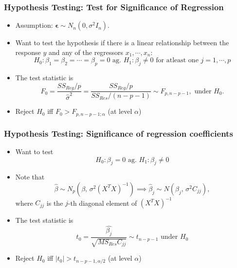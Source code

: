 \documentclass[10pt]{beamer} %
\begin{document}
\begin{frame}
	\frametitle{Hypothesis Testing: Test for Significance of Regression}
	\begin{itemize}
      \item Assumption: $\boldsymbol{\epsilon}\sim N_n(0, \sigma^2 I_n)$.
      \item Want to test the hypothesis if there is a linear
         relationship between the response $y$ and any of the regressors $x_1,
         \cdots, x_n$:
         $$H_0: \beta_1 = \beta_{2} = \cdots = \beta_p = 0 \mbox{ ag. } H_1:
         \beta_j \neq 0 \mbox{ for atleast one } j = 1,\cdots, p $$
		\item The test statistic is 
         $$ F_0 = \frac{SS_{Reg}/p}{\hat\sigma^2} =
         \frac{SS_{Reg}/p}{SS_{Res}/(n-p-1)} \sim F_{p, n-p-1}, \mbox{ under }
         H_0. $$
		\item Reject $H_0$ iff $F_0 >  F_{p, n-p-1; \alpha}$ (at level $\alpha$) 
	\end{itemize}	
\end{frame}

\begin{frame}
	\frametitle{Hypothesis Testing: Significance of regression coefficients}
	\begin{itemize}
		\item Want to test
		$$H_0: \beta_j = 0 \mbox{ ag. } H_1: \beta_j \neq 0 $$
      \smallskip
   \item Note that $$\hat\beta \sim N_p \left( \beta,\, \sigma^2 \left( X^TX
      \right)^{-1} \right) \implies \hat\beta_j \sim N \left( \beta_j,\,
      \sigma^2 C_{jj} \right),$$
		where $C_{jj}$ is the $j$-th diagonal element of $(X^TX)^{-1}$
		\item The test statistic is 
		$$t_0 = \frac{\hat{\beta_j} }{\sqrt{MS_{Res} C_{jj}}} \sim t_{n-p-1} \mbox{ under } H_0$$
		\item Reject $H_0$ iff $|t_0| > t_{n-p-1, \alpha/2}$ (at level $\alpha$) 
	\end{itemize}	
\end{frame}
\end{document}
